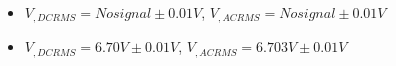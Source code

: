 \begin{itemize}
     \item $V_{, DCRMS}=No signal\pm 0.01\unit{V}$, $V_{, ACRMS}=No signal\pm 0.01\unit{V}$ 
     \item $V_{, DCRMS}=6.70V\pm 0.01\unit{V}$, $V_{, ACRMS}=6.703V\pm 0.01\unit{V}$\\
\end{itemize}